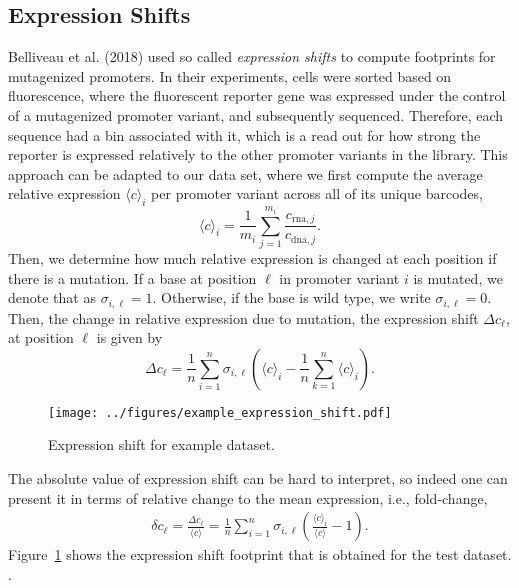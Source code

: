 \subsection{Expression Shifts}
Belliveau et al. (2018)\cite{belliveau2018systematic} used so called \textit{expression shifts} to compute footprints for mutagenized promoters. In their experiments, cells were sorted based on fluorescence, where the fluorescent reporter gene was expressed under the control of a mutagenized promoter variant, and subsequently sequenced. Therefore, each sequence had a bin associated with it, which is a read out for how strong the reporter is expressed relatively to the other promoter variants in the library. This approach can be adapted to our data set, where we first compute the average relative expression $\langle c \rangle_i$ per promoter variant across all of its unique barcodes,
\begin{equation}
    \langle c \rangle_i = \frac{1}{m_i}\sum_{j=1}^{m_i} \frac{c_{\mathrm{rna}, j}}{c_{\mathrm{dna}, j}}.
\end{equation}
Then, we determine how much relative expression is changed at each position if there is a mutation. If a base at position $\ell$ in promoter variant $i$ is mutated, we denote that as $\sigma_{i, \ell}=1$. Otherwise, if the base is wild type, we write $\sigma_{i, \ell}=0$. Then, the change in relative expression due to mutation, the expression shift $\Delta c_\ell$, at position $\ell$ is given by
\begin{equation}
   \Delta c_\ell =\frac{1}{n}\sum_{i=1}^n \sigma_{i, \ell} \left( \langle c \rangle_i - \frac{1}{n}\sum_{k=1}^n \langle c \rangle_i \right).
\end{equation}
\begin{figure}
    \texttt{[image: ../figures/example\_expression\_shift.pdf]}
    \caption{Expression shift for example dataset. }
    \label{fig:SI_expression_shift}
\end{figure}
The absolute value of expression shift can be hard to interpret, so indeed one can present it in terms of relative change to the mean expression, i.e., fold-change,
\begin{eqnarray}
    \delta c_\ell = \frac{\Delta c_\ell}{\langle c \rangle} =\frac{1}{n}\sum_{i=1}^n \sigma_{i, \ell} \left( \frac{\langle c \rangle_i}{\langle c \rangle} - 1 \right).
\end{eqnarray}
Figure~\ref{fig:SI_expression_shift} shows the expression shift footprint that is obtained for the test dataset. .
